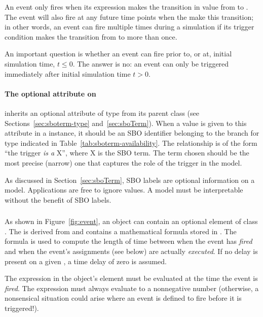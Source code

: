 An event only fires when its \Trigger expression makes the
transition in value from  to .  The event
will also fire at any future time points when the 
make this transition; in other words, an event can fire multiple
times during a simulation if its trigger condition makes the
transition from  to  more than once.

An important question is whether an event can fire prior to, or
at, initial simulation time, \ie $t \leq 0$.  The answer is no: an
event can only be triggered immediately after initial simulation
time \ie $t > 0$.


\paragraph{The optional  attribute on }
\label{sec:trigger-sboterm}

\Trigger inherits an optional  attribute of type
 from its parent class \SBase (see
Sections~\ref{sec:sboterm-type} and~\ref{sec:sboTerm}).  When a
value is given to this attribute in a \Trigger instance, it should
be an SBO identifier belonging to the branch for type \Trigger
indicated in Table~\ref{tab:sboterm-availability}.  The
relationship is of the form ``the trigger \emph{is a} X'', where X
is the SBO term.  The term chosen should be the most precise
(narrow) one that captures the role of the trigger in the model.

As discussed in Section~\ref{sec:sboTerm}, SBO labels are optional
information on a model.  Applications are free to ignore
 values.  A model must be interpretable without the
benefit of SBO labels.


\subsubsection{}
\label{sec:event-delay}

As shown in Figure~\ref{fig:event}, an \Event object can contain
an optional  element of class \Delay.  The \Delay is
derived from \SBase and contains a mathematical formula stored in
.  The formula is used to compute the length of time
between when the event has \emph{fired} and when the event's
assignments (see below) are actually \emph{executed}.  If no delay
is present on a given \Event, a time delay of zero is assumed.

The expression in the \Delay object's  element must be
evaluated at the time the event is \emph{fired}.  The expression
must always evaluate to a nonnegative number (otherwise, a
nonsensical situation could arise where an event is defined to
fire before it is triggered!).



